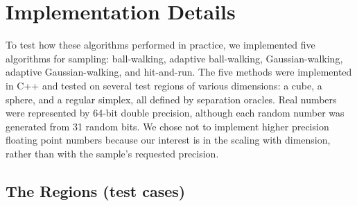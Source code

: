 \documentclass[11pt]{article}
\begin{document}
\section{Implementation Details}\label{implementation}

To test how these algorithms performed in practice, we implemented five algorithms for sampling: ball-walking, adaptive ball-walking, Gaussian-walking, adaptive Gaussian-walking, and hit-and-run. The five methods were implemented in C++ and tested on several test regions of various dimensions: a cube, a sphere, and a regular simplex, all defined by separation oracles. Real numbers were represented by 64-bit double precision, although each random number was generated from 31 random bits. We chose not to implement higher precision floating point numbers because our interest is in the scaling with dimension, rather than with the sample's requested precision.

\subsection{The Regions (test cases)}
\end{document}
